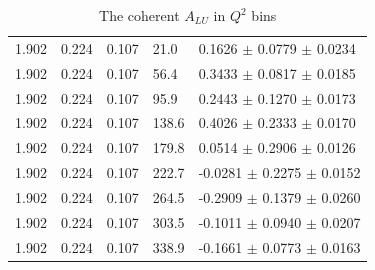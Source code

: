 \begin{table}[!h]
\begin{center}
\begin{tabular}{||l|l|l|l|l||}
  \hline                                                               
  1.902 & 0.224 & 0.107 & 21.0  &  0.1626 $\pm$  0.0779 $\pm$ 0.0234 \\
  1.902 & 0.224 & 0.107 & 56.4  &  0.3433 $\pm$  0.0817 $\pm$ 0.0185 \\
  1.902 & 0.224 & 0.107 & 95.9  &  0.2443 $\pm$  0.1270 $\pm$ 0.0173 \\
  1.902 & 0.224 & 0.107 & 138.6 &  0.4026 $\pm$  0.2333 $\pm$ 0.0170 \\
  1.902 & 0.224 & 0.107 & 179.8 &  0.0514 $\pm$  0.2906 $\pm$ 0.0126 \\
  1.902 & 0.224 & 0.107 & 222.7 & -0.0281 $\pm$  0.2275 $\pm$ 0.0152 \\
  1.902 & 0.224 & 0.107 & 264.5 & -0.2909 $\pm$  0.1379 $\pm$ 0.0260 \\
  1.902 & 0.224 & 0.107 & 303.5 & -0.1011 $\pm$  0.0940 $\pm$ 0.0207 \\
  1.902 & 0.224 & 0.107 & 338.9 & -0.1661 $\pm$  0.0773 $\pm$ 0.0163 \\
         \hline \hline
      \end{tabular}
      \caption{ The coherent $A_{LU}$ in $Q^2$ bins}
      \label{table:Coh_Q2_BSA}
   \end{center}
\end{table}                    

